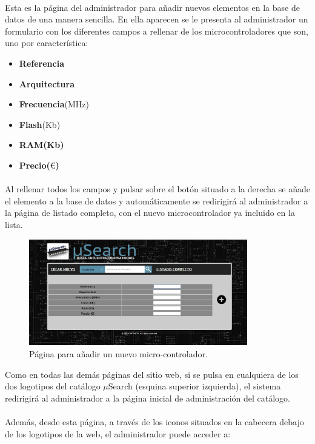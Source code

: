 \paragraph{} Esta es la página del administrador para añadir nuevos elementos en la base de datos de una manera sencilla. En ella aparecen se le presenta al administrador un formulario con los diferentes campos a rellenar de los microcontroladores que son, uno por característica:
\begin{itemize}
\item \textbf{Referencia}
\item \textbf{Arquitectura}
\item \textbf{Frecuencia}(MHz) 
\item \textbf{Flash}(Kb)
\item \textbf{RAM(Kb)} 
\item \textbf{Precio($\euro$)}
\end{itemize}

\paragraph{} Al rellenar todos los campos y pulsar sobre el botón situado a la derecha se añade el elemento a la base de datos y automáticamente se redirigirá al administrador a la página de listado completo, con el nuevo microcontrolador ya incluido en la lista.

\begin{figure}[h!]
	\centering
	\includegraphics[width=0.85\textwidth]{img/anyadir}
	\caption{Página para añadir un nuevo micro-controlador.}
	\label{fig:anyadir}
\end{figure}

Como en todas las demás páginas del sitio web, si se pulsa en cualquiera de los dos logotipos del catálogo $\mu$Search (esquina superior izquierda), el sistema redirigirá al administrador a la página inicial de administración del catálogo.

\paragraph{}Además, desde esta página, a través de los iconos situados en la cabecera debajo de los logotipos de la web, el administrador puede acceder a:

